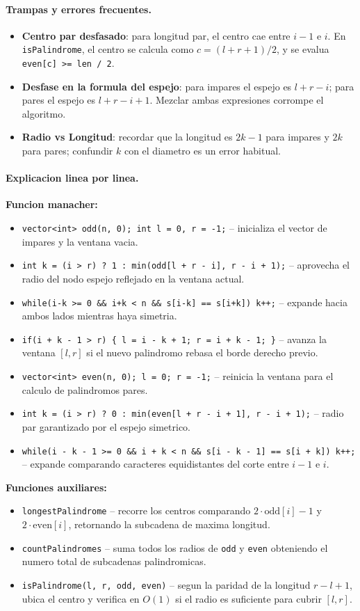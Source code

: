 \paragraph{Trampas y errores frecuentes.}
\begin{itemize}\setlength\itemsep{0pt}
	\item \textbf{Centro par desfasado}: para longitud par, el centro cae entre $i-1$ e $i$. En \verb|isPalindrome|, el centro se calcula como $c = (l + r + 1) / 2$, y se evalua \verb|even[c] >= len / 2|.
	\item \textbf{Desfase en la formula del espejo}: para impares el espejo es $l + r - i$; para pares el espejo es $l + r - i + 1$. Mezclar ambas expresiones corrompe el algoritmo.
	\item \textbf{Radio vs Longitud}: recordar que la longitud es $2k - 1$ para impares y $2k$ para pares; confundir $k$ con el diametro es un error habitual.
\end{itemize}

\paragraph{Explicacion linea por linea.}
\textbf{Funcion manacher:}
\begin{itemize}\setlength\itemsep{0pt}
	\item \verb|vector<int> odd(n, 0); int l = 0, r = -1;| -- inicializa el vector de impares y la ventana vacia.
	\item \verb|int k = (i > r) ? 1 : min(odd[l + r - i], r - i + 1);| -- aprovecha el radio del nodo espejo reflejado en la ventana actual.
	\item \verb|while(i-k >= 0 && i+k < n && s[i-k] == s[i+k]) k++;| -- expande hacia ambos lados mientras haya simetria.
	\item \verb|if(i + k - 1 > r) { l = i - k + 1; r = i + k - 1; }| -- avanza la ventana $[l, r]$ si el nuevo palindromo rebasa el borde derecho previo.
	\item \verb|vector<int> even(n, 0); l = 0; r = -1;| -- reinicia la ventana para el calculo de palindromos pares.
	\item \verb|int k = (i > r) ? 0 : min(even[l + r - i + 1], r - i + 1);| -- radio par garantizado por el espejo simetrico.
	\item \verb|while(i - k - 1 >= 0 && i + k < n && s[i - k - 1] == s[i + k]) k++;| -- expande comparando caracteres equidistantes del corte entre $i-1$ e $i$.
\end{itemize}
\textbf{Funciones auxiliares:}
\begin{itemize}\setlength\itemsep{0pt}
	\item \verb|longestPalindrome| -- recorre los centros comparando $2 \cdot \text{odd}[i] - 1$ y $2 \cdot \text{even}[i]$, retornando la subcadena de maxima longitud.
	\item \verb|countPalindromes| -- suma todos los radios de \verb|odd| y \verb|even| obteniendo el numero total de subcadenas palindromicas.
	\item \verb|isPalindrome(l, r, odd, even)| -- segun la paridad de la longitud $r - l + 1$, ubica el centro y verifica en $O(1)$ si el radio es suficiente para cubrir $[l, r]$.
\end{itemize}


